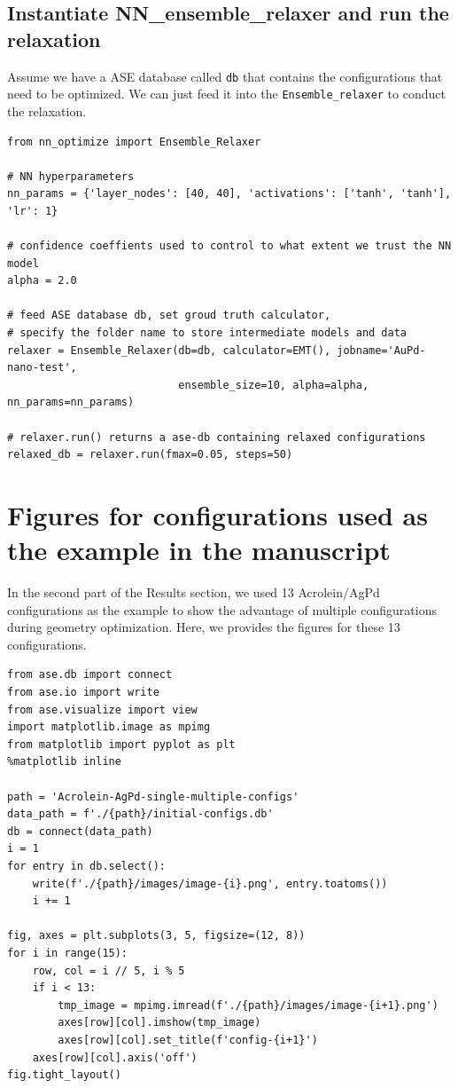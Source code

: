 \documentclass[aps,prl,citeautoscript,preprint,citeautoscript,showkeys]{revtex4-1}
\begin{document}
\subsection{Instantiate NN\_ensemble\_relaxer and run the relaxation}
\label{sec:org17eaeb2}

Assume we have a ASE database called \texttt{db} that contains the configurations that need to be optimized. We can just feed it into the \texttt{Ensemble\_relaxer} to conduct the relaxation.

\begin{verbatim}
from nn_optimize import Ensemble_Relaxer

# NN hyperparameters
nn_params = {'layer_nodes': [40, 40], 'activations': ['tanh', 'tanh'], 'lr': 1}

# confidence coeffients used to control to what extent we trust the NN model
alpha = 2.0

# feed ASE database db, set groud truth calculator,
# specify the folder name to store intermediate models and data
relaxer = Ensemble_Relaxer(db=db, calculator=EMT(), jobname='AuPd-nano-test',
                           ensemble_size=10, alpha=alpha, nn_params=nn_params)

# relaxer.run() returns a ase-db containing relaxed configurations
relaxed_db = relaxer.run(fmax=0.05, steps=50)
\end{verbatim}



\section{Figures for configurations used as the example in the manuscript}
\label{sec:org3d8def6}

In the second part of the Results section, we used 13 Acrolein/AgPd configurations as the example to show the advantage of multiple configurations during geometry optimization. Here, we provides the figures for these 13 configurations.

\begin{verbatim}
from ase.db import connect
from ase.io import write
from ase.visualize import view
import matplotlib.image as mpimg
from matplotlib import pyplot as plt
%matplotlib inline

path = 'Acrolein-AgPd-single-multiple-configs'
data_path = f'./{path}/initial-configs.db'
db = connect(data_path)
i = 1
for entry in db.select():
    write(f'./{path}/images/image-{i}.png', entry.toatoms())
    i += 1

fig, axes = plt.subplots(3, 5, figsize=(12, 8))
for i in range(15):
    row, col = i // 5, i % 5
    if i < 13:
        tmp_image = mpimg.imread(f'./{path}/images/image-{i+1}.png')
        axes[row][col].imshow(tmp_image)
        axes[row][col].set_title(f'config-{i+1}')
    axes[row][col].axis('off')
fig.tight_layout()
\end{verbatim}
\end{document}
